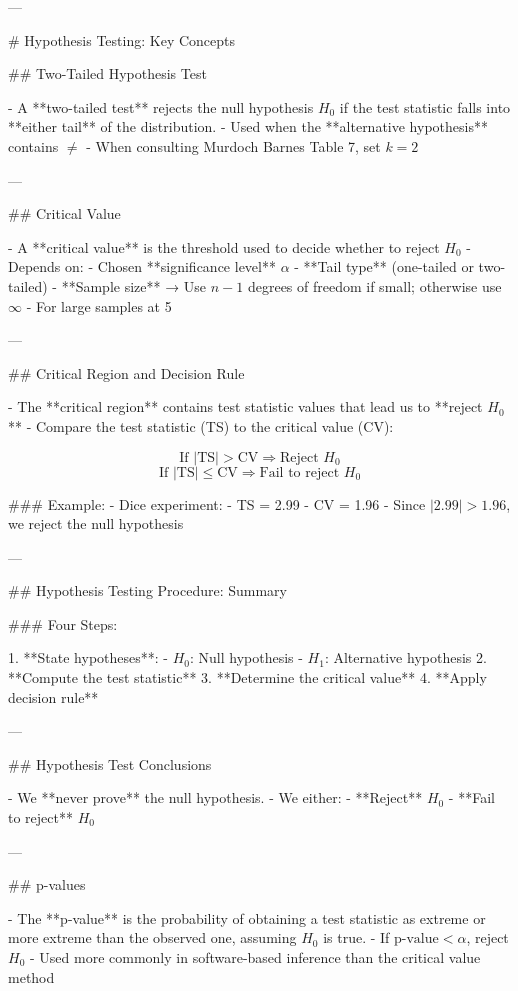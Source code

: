 ---

# Hypothesis Testing: Key Concepts

## Two-Tailed Hypothesis Test

- A **two-tailed test** rejects the null hypothesis \( H_0 \) if the test statistic falls into **either tail** of the distribution.
- Used when the **alternative hypothesis** contains \( \neq \)
- When consulting Murdoch Barnes Table 7, set \( k = 2 \)

---

## Critical Value

- A **critical value** is the threshold used to decide whether to reject \( H_0 \)
- Depends on:
  - Chosen **significance level** \( \alpha \)
  - **Tail type** (one-tailed or two-tailed)
  - **Sample size** → Use \( n - 1 \) degrees of freedom if small; otherwise use \( \infty \)
- For large samples at 5%

---

## Critical Region and Decision Rule

- The **critical region** contains test statistic values that lead us to **reject \( H_0 \)**
- Compare the test statistic (TS) to the critical value (CV):

\[
\text{If } |\text{TS}| > \text{CV} \Rightarrow \text{Reject } H_0
\]
\[
\text{If } |\text{TS}| \leq \text{CV} \Rightarrow \text{Fail to reject } H_0
\]

### Example:
- Dice experiment:
  - TS = 2.99
  - CV = 1.96
  - Since \( |2.99| > 1.96 \), we reject the null hypothesis

---

## Hypothesis Testing Procedure: Summary

### Four Steps:

1. **State hypotheses**:
   - \( H_0 \): Null hypothesis  
   - \( H_1 \): Alternative hypothesis  
2. **Compute the test statistic**
3. **Determine the critical value**
4. **Apply decision rule**

---

## Hypothesis Test Conclusions

- We **never prove** the null hypothesis.
- We either:
  - **Reject** \( H_0 \)
  - **Fail to reject** \( H_0 \)

---

## p-values

- The **p-value** is the probability of obtaining a test statistic as extreme or more extreme than the observed one, assuming \( H_0 \) is true.
- If \( \text{p-value} < \alpha \), reject \( H_0 \)
- Used more commonly in software-based inference than the critical value method

